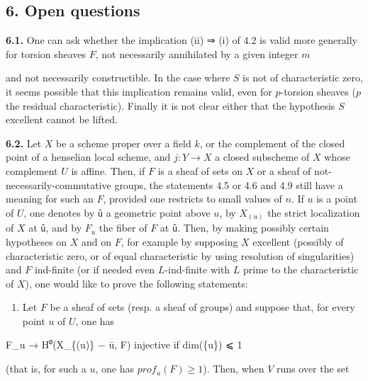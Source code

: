 \documentclass[
]{article}
\newenvironment{Shaded}{}{}
\newcommand{\NormalTok}[1]{#1}
\providecommand{\tightlist}{%
  \setlength{\itemsep}{0pt}\setlength{\parskip}{0pt}}
\begin{document}
\subsection{6. Open questions}\label{open-questions}

\textbf{6.1.} One can ask whether the implication (ii) ⇒ (i) of 4.2 is
valid more generally for torsion sheaves \(F\), not necessarily
annihilated by a given integer \(m\)

and not necessarily constructible. In the case where \(S\) is not of
characteristic zero, it seems possible that this implication remains
valid, even for \(p\)-torsion sheaves (\(p\) the residual
characteristic). Finally it is not clear either that the hypothesis
\(S\) excellent cannot be lifted.

\textbf{6.2.} Let \(X\) be a scheme proper over a field \(k\), or the
complement of the closed point of a henselian local scheme, and
\(j : Y \to X\) a closed subscheme of \(X\) whose complement \(U\) is
affine. Then, if \(F\) is a sheaf of sets on \(X\) or a sheaf of
not-necessarily-commutative groups, the statements 4.5 or 4.6 and 4.9
still have a meaning for such an \(F\), provided one restricts to small
values of \(n\). If \(u\) is a point of \(U\), one denotes by \texttt{ū}
a geometric point above \(u\), by \(X_{(u)}\) the strict localization of
\(X\) at \texttt{ū}, and by \(F_{u}\) the fiber of \(F\) at \texttt{ū}.
Then, by making possibly certain hypotheses on \(X\) and on \(F\), for
example by supposing \(X\) excellent (possibly of characteristic zero,
or of equal characteristic by using resolution of singularities) and
\(F\) ind-finite (or if needed even \(L\)-ind-finite with \(L\) prime to
the characteristic of \(X\)), one would like to prove the following
statements:

\begin{enumerate}
\def\labelenumi{\alph{enumi})}
\tightlist
\item
  Let \(F\) be a sheaf of sets (resp. a sheaf of groups) and suppose
  that, for every point \(u\) of \(U\), one has
\end{enumerate}

\begin{Shaded}
\begin{Highlighting}[]
\NormalTok{F\_u → H⁰(X\_\{(u)\} − ū, F)  injective if dim(\{u\}) ⩽ 1}
\end{Highlighting}
\end{Shaded}

(that is, for such a \(u\), one has \(prof_{u}(F) \geqslant 1\)). Then,
when \(V\) runs over the set
\end{document}
